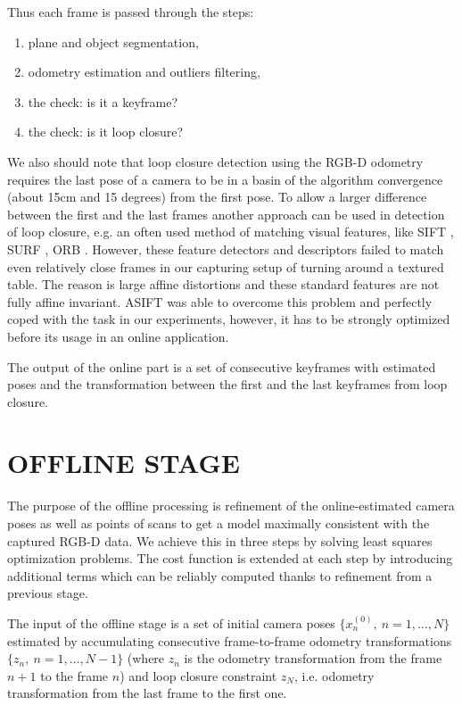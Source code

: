 \documentclass[letterpaper, 10 pt, conference]{ieeeconf}  %
\begin{document}
Thus each frame is passed through the steps:

\begin{enumerate}
 \item plane and object segmentation,
 \item odometry estimation and outliers filtering,
 \item the check: is it a keyframe?
 \item the check: is it loop closure?
\end{enumerate}

We also should note that loop closure detection using the RGB-D odometry requires
the last pose of a camera to be in a basin of
the algorithm convergence (about 15cm and 15 degrees) from the first pose. 
To allow a larger difference between the first and the last frames
another approach can be used in detection of loop closure, e.g.
an often used method of matching visual features, like
SIFT \cite{lowe2004distinctive}, SURF \cite{bay2006surf}, ORB \cite{rublee2011orb}.
However, these feature detectors and descriptors failed to match even
relatively close frames in our capturing setup of turning around a textured table.
The reason is large affine distortions
and these standard features are not fully affine invariant.
ASIFT \cite{morel2009asift} was able to overcome this problem
and perfectly coped with the task in our experiments,
however, it has to be strongly optimized before its usage in an online application.

The output of the online part is a set of consecutive keyframes with 
estimated poses and the transformation between the first and the last 
keyframes from loop closure.


\section{OFFLINE STAGE}

The purpose of the offline processing is refinement of the online-estimated 
camera poses as well as points of scans to get a model maximally 
consistent with the captured RGB-D data. We achieve this in three steps by 
solving least squares optimization problems. The cost function is extended at each step 
by introducing additional terms which can be reliably computed
thanks to refinement from a previous stage.


The input of the offline stage is a set of initial camera poses $\{x_n^{(0)},~n=1,\dots, N\}$ 
estimated by accumulating consecutive frame-to-frame odometry transformations 
$\{z_n,~n=1,\dots, N-1\}$  
(where $z_n$ is the odometry transformation from the frame $n+1$ to the frame $n$)
and loop closure constraint $z_{N}$, 
i.e. odometry transformation from the last frame to the first one.
\end{document}
